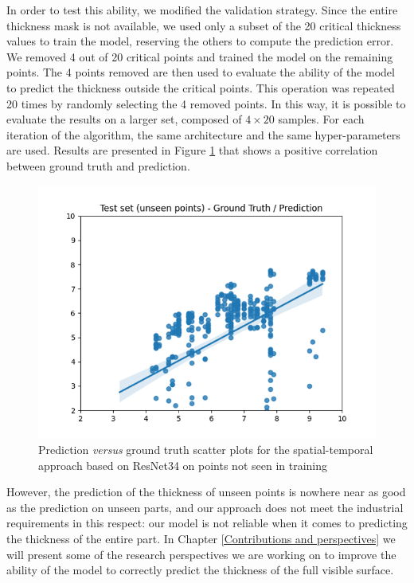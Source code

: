 In order to test this ability, we modified the validation strategy. Since the entire thickness mask is not available, we used only a subset of the 20 critical thickness values to train the model, reserving the others to compute the prediction error. %
We removed 4 out of 20 critical points and trained the model on the remaining points. The 4 points removed are then  used to evaluate the ability of the model to predict the thickness outside the critical points. This operation was repeated 20 times by randomly selecting the 4 removed points. In this way, it is possible to evaluate the results on a larger set, composed of $4\times20$ samples.
For each iteration of the algorithm, the same architecture and the same hyper-parameters are used. Results are presented in Figure \ref{fig:gt_prediction_unseen} that shows a positive correlation between ground truth and prediction. 
%

\begin{figure}
\centering
\includegraphics[scale=0.90]{images/chapter_4/unseen_point_scatter.png}
\caption{Prediction \textit{versus} ground truth scatter plots for the spatial-temporal approach based on ResNet34 on points not seen in training}
\label{fig:gt_prediction_unseen}
\end{figure}
%
However, the prediction of the thickness of unseen points is nowhere near as good as the prediction on unseen parts, and our approach does not meet the industrial requirements in this respect: our model is not reliable when it comes to predicting the thickness of the entire part. In Chapter \ref{Contributions and perspectives} we will present some of the research perspectives we are working on to improve the ability of the model to correctly predict the thickness of the full visible surface. 

